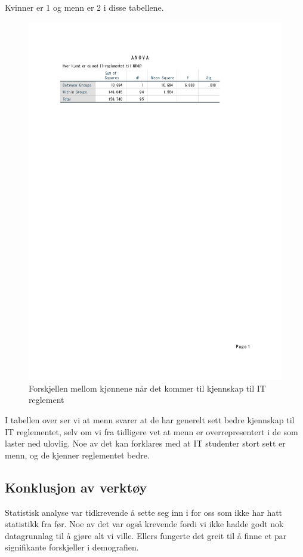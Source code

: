 Kvinner er 1 og menn er 2 i disse tabellene.
\begin{figure}[H]
    \centering
    \includegraphics[scale=0.7]{case_1/bilder/kjonn_kjent_anova.pdf}
    \caption{Forskjellen mellom kjønnene når det kommer til kjennskap til IT reglement}
    \label{fig:fakultet_pastander_anova}
\end{figure}

I tabellen over ser vi at menn svarer at de har generelt sett bedre kjennskap til IT reglementet, selv om vi fra tidligere vet at menn er overrepresentert i de som laster ned ulovlig. Noe av det kan forklares med at IT studenter stort sett er menn, og de kjenner reglementet bedre. 

\subsection{Konklusjon av verktøy}
Statistisk analyse var tidkrevende å sette seg inn i for oss som ikke har hatt statistikk fra før. Noe av det var også krevende fordi vi ikke hadde godt nok datagrunnlag til å gjøre alt vi ville. Ellers fungerte det greit til å finne et par signifikante forskjeller i demografien. 

